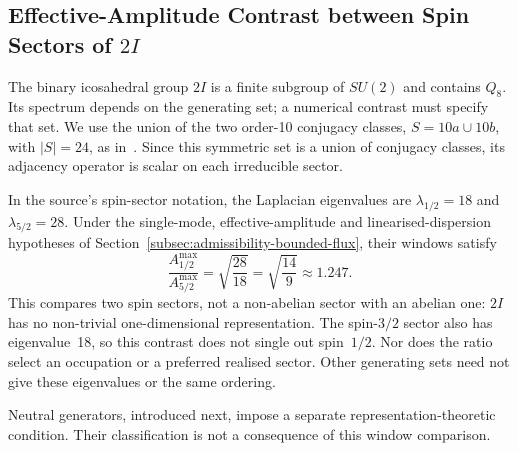 \subsection{Effective-Amplitude Contrast between Spin Sectors of $2I$}
  \label{subsec:q8-to-2i}

  The binary icosahedral group $2I$ is a finite subgroup of $SU(2)$ and contains $Q_8$.
  Its spectrum depends on the generating set; a numerical contrast must specify that set.
  We use the union of the two order-10 conjugacy classes,
  $S=10a\cup10b$, with $|S|=24$, as in~\cite{Beau2026a1}.
  Since this symmetric set is a union of conjugacy classes, its adjacency operator is scalar
  on each irreducible sector.

  In the source's spin-sector notation, the Laplacian eigenvalues are
  $\lambda_{1/2}=18$ and $\lambda_{5/2}=28$.
  Under the single-mode, effective-amplitude and linearised-dispersion hypotheses of
  Section~\ref{subsec:admissibility-bounded-flux}, their windows satisfy
  \begin{equation}
    \frac{A_{1/2}^{\max}}{A_{5/2}^{\max}}
    = \sqrt{\frac{28}{18}} = \sqrt{\frac{14}{9}} \approx 1.247.
  \end{equation}
  This compares two spin sectors, not a non-abelian sector with an abelian one:
  $2I$ has no non-trivial one-dimensional representation.
  The spin-$3/2$ sector also has eigenvalue~18, so this contrast does not single out spin~$1/2$.
  Nor does the ratio select an occupation or a preferred realised sector.
  Other generating sets need not give these eigenvalues or the same ordering.

  Neutral generators, introduced next, impose a separate representation-theoretic condition.
  Their classification is not a consequence of this window comparison.
